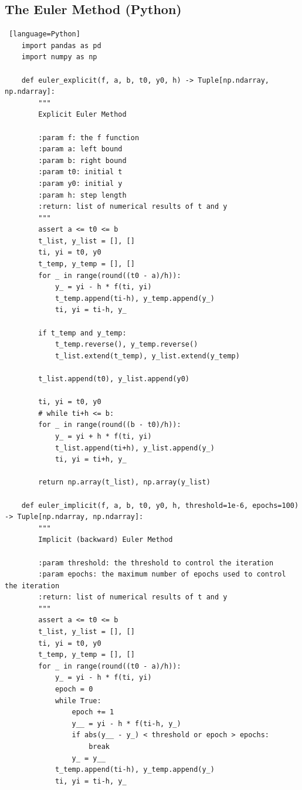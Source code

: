 \documentclass[a4paper]{article}
\begin{document}
\begin{appendices}
    \clearpage
    
    \subsection{The Euler Method (Python)}
    
    \begin{lstlisting} [language=Python]
    import pandas as pd
    import numpy as np
    
    def euler_explicit(f, a, b, t0, y0, h) -> Tuple[np.ndarray, np.ndarray]:
        """
        Explicit Euler Method
    
        :param f: the f function
        :param a: left bound
        :param b: right bound
        :param t0: initial t
        :param y0: initial y
        :param h: step length
        :return: list of numerical results of t and y
        """
        assert a <= t0 <= b
        t_list, y_list = [], []
        ti, yi = t0, y0
        t_temp, y_temp = [], []
        for _ in range(round((t0 - a)/h)):
            y_ = yi - h * f(ti, yi)
            t_temp.append(ti-h), y_temp.append(y_)
            ti, yi = ti-h, y_
    
        if t_temp and y_temp:
            t_temp.reverse(), y_temp.reverse()
            t_list.extend(t_temp), y_list.extend(y_temp)
    
        t_list.append(t0), y_list.append(y0)
    
        ti, yi = t0, y0
        # while ti+h <= b:
        for _ in range(round((b - t0)/h)):
            y_ = yi + h * f(ti, yi)
            t_list.append(ti+h), y_list.append(y_)
            ti, yi = ti+h, y_
    
        return np.array(t_list), np.array(y_list)
    
    def euler_implicit(f, a, b, t0, y0, h, threshold=1e-6, epochs=100) -> Tuple[np.ndarray, np.ndarray]:
        """
        Implicit (backward) Euler Method

        :param threshold: the threshold to control the iteration
        :param epochs: the maximum number of epochs used to control the iteration
        :return: list of numerical results of t and y
        """
        assert a <= t0 <= b
        t_list, y_list = [], []
        ti, yi = t0, y0
        t_temp, y_temp = [], []
        for _ in range(round((t0 - a)/h)):
            y_ = yi - h * f(ti, yi)
            epoch = 0
            while True:
                epoch += 1
                y__ = yi - h * f(ti-h, y_)
                if abs(y__ - y_) < threshold or epoch > epochs:
                    break
                y_ = y__
            t_temp.append(ti-h), y_temp.append(y_)
            ti, yi = ti-h, y_
    

\end{lstlisting}
\end{appendices}
\end{document}

